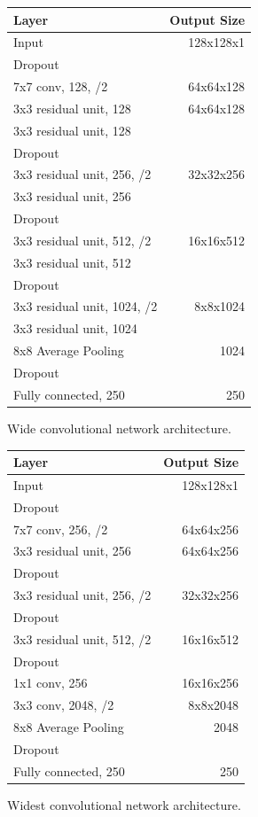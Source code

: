 \documentclass[10pt,twocolumn,letterpaper]{article}
\begin{document}
\begin{figure}[h]
\begin{center}
\begin{tabular}{l | r}
Layer & Output Size \\ \hline \hline
Input	& 128x128x1\\
Dropout &  \\
7x7 conv, 128, /2	 & 64x64x128\\
3x3 residual unit, 128	& 64x64x128\\
3x3 residual unit, 128 & \\
Dropout	&  \\
3x3 residual unit, 256, /2 & 32x32x256\\
3x3 residual unit, 256 & \\
Dropout & \\
3x3 residual unit, 512, /2 & 16x16x512\\
3x3 residual unit, 512 & \\
Dropout	& \\
3x3 residual unit, 1024, /2	& 8x8x1024\\
3x3 residual unit, 1024	&\\
8x8 Average Pooling	& 1024\\
Dropout& 	\\
Fully connected, 250 	& 250
\end{tabular}
\caption{Wide convolutional network architecture.}
\end{center}
\end{figure}

\begin{figure}[h]
\begin{center}
\begin{tabular}{l | r}
Layer & Output Size \\ \hline \hline
Input	& 128x128x1\\
Dropout & \\
7x7 conv, 256, /2	 & 64x64x256\\
3x3 residual unit, 256	& 64x64x256\\
Dropout	&  \\
3x3 residual unit, 256, /2 & 32x32x256\\
Dropout & \\
3x3 residual unit, 512, /2 & 16x16x512\\
Dropout	& \\
1x1 conv, 256 & 16x16x256 \\
3x3 conv, 2048, /2 & 8x8x2048 \\
8x8 Average Pooling	& 2048\\
Dropout& 	\\
Fully connected, 250	& 250
\end{tabular}
\caption{Widest convolutional network architecture.}
\end{center}
\end{figure}
\end{document}
